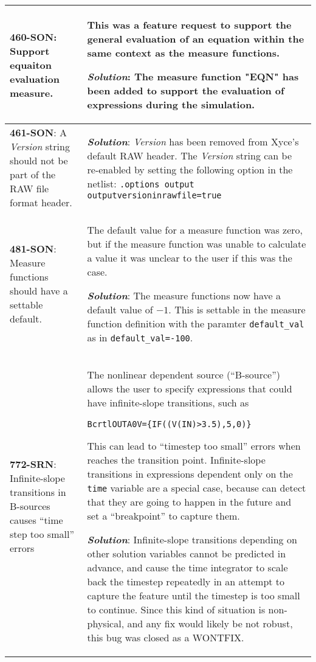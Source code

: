 \begin{longtable}[h] {>{\raggedright\small}m{2in}|>{\raggedright\let\\\tabularnewline\small}m{3.5in}}
\textbf{460-SON}: Support equaiton evaluation measure. & This was a feature request 
to support the general evaluation of an equation within the same context as 
the measure functions.

\textbf{\textit{Solution}}:  The measure function "EQN" has been added to support 
the evaluation of expressions during the simulation.
\\ \hline

\textbf{461-SON}: A \emph{Version} string should not be part of the RAW file format header. & 

\textbf{\textit{Solution}}:  \emph{Version} has been removed from Xyce's default RAW header. 
The \emph{Version} string can be re-enabled by setting the following option in the netlist:
\texttt{.options output outputversioninrawfile=true}
\\ \hline

\textbf{481-SON}: Measure functions should have a settable default. &  The default value
for a measure function was zero, but if the measure function was unable to calculate a value
it was unclear to the user if this was the case. 

\textbf{\textit{Solution}}:  The measure functions now have a default value of $-1$.  This is settable 
in the measure function definition with the paramter \texttt{default\_val} as in \texttt{default\_val=-100}.
\\ \hline



\textbf{772-SRN}: Infinite-slope transitions in B-sources causes ``time step too
small'' errors & The nonlinear dependent source (``B-source'') allows the user
to specify expressions that could have infinite-slope transitions, such as

\begin{alltt} Bcrtl OUTA 0 V=\{ IF( (V(IN) > 3.5), 5, 0 ) \} \end{alltt}

This can lead to ``timestep too small'' errors when \Xyce{} reaches the
transition point.  Infinite-slope transitions in expressions dependent only on
the \texttt{time} variable are a special case, because \Xyce{} can detect that
they are going to happen in the future and set a ``breakpoint'' to capture
them.  

\textbf{\textit{Solution}}: Infinite-slope transitions depending on other
solution variables cannot be predicted in advance, and cause the time
integrator to scale back the timestep repeatedly in an attempt to capture the
feature until the timestep is too small to continue.  Since this kind of
situation is non-physical, and any fix would likely be not robust, this bug was
closed as a WONTFIX.
\\ \hline



\end{longtable}
